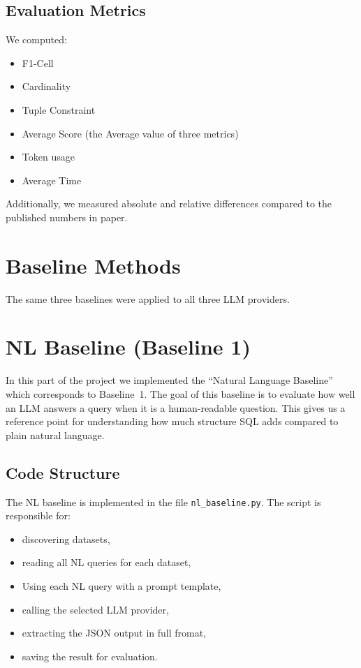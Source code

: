 \documentclass[12pt]{article}
\begin{document}
\subsection{Evaluation Metrics}
We computed:
\begin{itemize}
    \item F1-Cell
    \item Cardinality
    \item Tuple Constraint
    \item Average Score (the Average value of three metrics)
    \item Token usage
    \item Average Time
\end{itemize}

Additionally, we measured absolute and relative differences compared to the published numbers in paper.

\section{Baseline Methods}

The same three baselines were applied to all three LLM providers.

\section{NL Baseline (Baseline 1)}

In this part of the project we implemented the ``Natural Language Baseline'' which corresponds to Baseline~1. The goal of this baseline is to evaluate how well an LLM answers a query when it is a human-readable question. This gives us a reference point for understanding how much structure SQL adds compared to plain natural language.

\subsection{Code Structure}

The NL baseline is implemented in the file \texttt{nl\_baseline.py}.  
The script is responsible for:
\begin{itemize}
    \item discovering datasets,
    \item reading all NL queries for each dataset,
    \item Using each NL query with a prompt template,
    \item calling the selected LLM provider,
    \item extracting the JSON output in full fromat, 
    \item saving the result for evaluation.
\end{itemize}
\end{document}
